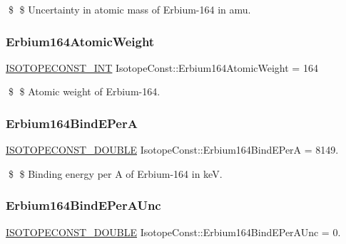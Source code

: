 \$ \$ Uncertainty in atomic mass of Erbium-\/164 in amu. \mbox{\label{group___isotope_const-_erbium-_er164_ga46d00bd5c100f417d45352ad68d05668}} 
\subsubsection{\texorpdfstring{Erbium164\+Atomic\+Weight}{Erbium164AtomicWeight}}
{\footnotesize\ttfamily \mbox{\hyperlink{group___isotope_const-_macros_ga5f18360b3e99483a35c32d789e62621c}{I\+S\+O\+T\+O\+P\+E\+C\+O\+N\+S\+T\+\_\+\+I\+NT}} Isotope\+Const\+::\+Erbium164\+Atomic\+Weight = 164}

\$ \$ Atomic weight of Erbium-\/164. \mbox{\label{group___isotope_const-_erbium-_er164_ga4d5a79f8b0b19cbb885a678174206bbd}} 
\subsubsection{\texorpdfstring{Erbium164\+Bind\+E\+PerA}{Erbium164BindEPerA}}
{\footnotesize\ttfamily \mbox{\hyperlink{group___isotope_const-_macros_ga8f45a7272ce02c0b4c65c44636ed719a}{I\+S\+O\+T\+O\+P\+E\+C\+O\+N\+S\+T\+\_\+\+D\+O\+U\+B\+LE}} Isotope\+Const\+::\+Erbium164\+Bind\+E\+PerA = 8149.}

\$ \$ Binding energy per A of Erbium-\/164 in keV. \mbox{\label{group___isotope_const-_erbium-_er164_ga3fec87595f29e10c88cb79cfc42baf9e}} 
\subsubsection{\texorpdfstring{Erbium164\+Bind\+E\+Per\+A\+Unc}{Erbium164BindEPerAUnc}}
{\footnotesize\ttfamily \mbox{\hyperlink{group___isotope_const-_macros_ga8f45a7272ce02c0b4c65c44636ed719a}{I\+S\+O\+T\+O\+P\+E\+C\+O\+N\+S\+T\+\_\+\+D\+O\+U\+B\+LE}} Isotope\+Const\+::\+Erbium164\+Bind\+E\+Per\+A\+Unc = 0.}

